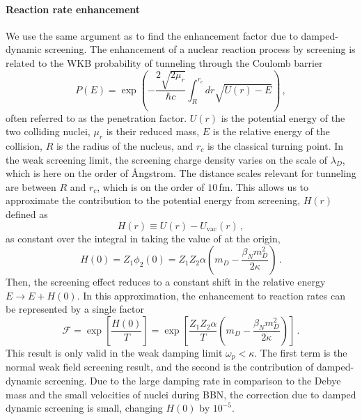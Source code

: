 \paragraph{Reaction rate enhancement}
We use the same argument as \cite{Salpeter:1954nc} to find the enhancement factor due to damped-dynamic screening. The enhancement of a nuclear reaction process by screening is related to the WKB probability of tunneling through the Coulomb barrier
\begin{equation} \label{eq:penprob}
    P(E) = \exp{\left( - \frac{2\sqrt{2 \mu_r}}{\hbar c}\int_{R}^{r_c}dr \sqrt{U(r)-E}\right)}\,,
\end{equation}
often referred to as the penetration factor. $U(r)$ is the potential energy of the two colliding nuclei, $\mu_r$ is their reduced mass, $E$ is the relative energy of the collision, $R$ is the radius of the nucleus, and $r_c$ is the classical turning point. In the weak screening limit, the screening charge density varies on the scale of $\lambda_D$, which is here on the order of \AA ngstrom. The distance scales relevant for tunneling are between $R$ and $r_c$, which is on the order of $10\,$fm. This allows us to approximate the contribution to the potential energy from screening, $H(r)$ defined as
\begin{equation}
    H(r) \equiv U(r) - U_\text{vac}(r)\,,
\end{equation}
as constant over the integral in  taking the value of  at the origin,
\begin{equation}
     H(0) = Z_1\phi_2(0) = Z_1 Z_2 \alpha \left(m_D - \frac{\beta_N m_D^2}{2 \kappa}\right)\,.
\end{equation}
Then, the screening effect reduces to a constant shift in the relative energy $E \rightarrow E+H(0)$. In this approximation, the enhancement to reaction rates can be represented by a single factor \cite{Salpeter:1954nc,Kravchuk:2014sps}
\begin{equation}\label{eq:DDSenhance}
   \mathcal{F} = \exp\left[\frac{H(0)}{T} \right]=\exp\left[\frac{Z_1 Z_2 \alpha}{T} \left(m_D - \frac{\beta_N m_D^2}{2 \kappa}\right)\right]\,.
\end{equation}
This result is only valid in the weak damping limit $\omega_p<\kappa$. The first term is the normal weak field screening result, and the second is the contribution of damped-dynamic screening. Due to the large damping rate in comparison to the Debye mass and the small velocities of nuclei  during BBN, the correction due to damped dynamic screening is small, changing $H(0)$ by $10^{-5}$. 

